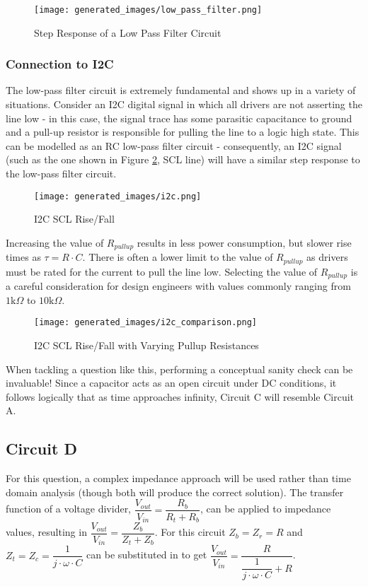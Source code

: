 \documentclass[main.tex]{subfiles}
\begin{document}
\begin{figure}[H]
    \centering
    \texttt{[image: generated\_images/low\_pass\_filter.png]}
    \caption{Step Response of a Low Pass Filter Circuit}
    \label{fig:step-response-low-pass-filter}
\end{figure}

\subsubsection{Connection to I2C}
The low-pass filter circuit is extremely fundamental and shows up in a variety of situations. Consider an I2C digital signal in which all drivers are not asserting the line low - in this case, the signal trace has some parasitic capacitance to ground and a pull-up resistor is responsible for pulling the line to a logic high state. This can be modelled as an RC low-pass filter circuit - consequently, an I2C signal (such as the one shown in Figure \ref{fig:i2c_scl}, SCL line) will have a similar step response to the low-pass filter circuit.

\begin{figure}[H]
    \centering
    \texttt{[image: generated\_images/i2c.png]}
    \caption{I2C SCL Rise/Fall}
    \label{fig:i2c_scl}
\end{figure}

\noindent Increasing the value of $R_{pullup}$ results in less power consumption, but slower rise times as $\tau = R \cdot C$. There is often a lower limit to the value of $R_{pullup}$ as drivers must be rated for the current to pull the line low. Selecting the value of $R_{pullup}$ is a careful consideration for design engineers with values commonly ranging from $1 \text{k} \Omega$ to $10 \text{k} \Omega$.

\begin{figure}[H]
    \centering
    \texttt{[image: generated\_images/i2c\_comparison.png]}
    \caption{I2C SCL Rise/Fall with Varying Pullup Resistances}
    \label{fig:i2c_comparison}
\end{figure}

\noindent When tackling a question like this, performing a conceptual sanity check can be invaluable! Since a capacitor acts as an open circuit under DC conditions, it follows logically that as time approaches infinity, Circuit C will resemble Circuit A. 

\subsection{Circuit D}
For this question, a complex impedance approach will be used rather than time domain analysis (though both will produce the correct solution). The transfer function of a voltage divider, $\dfrac{V_{out}}{V_{in}} = \dfrac{R_b}{R_t + R_b}$, can be applied to impedance values, resulting in $\dfrac{V_{out}}{V_{in}} = \dfrac{Z_b}{Z_t + Z_b}$. For this circuit $Z_b = Z_r = R$ and $Z_t = Z_c = \dfrac{1}{j \cdot \omega \cdot C}$ can be substituted in to get $\dfrac{V_{out}}{V_{in}} = \dfrac{R}{\dfrac{1}{j \cdot \omega \cdot C} + R}$. \newline
\end{document}
